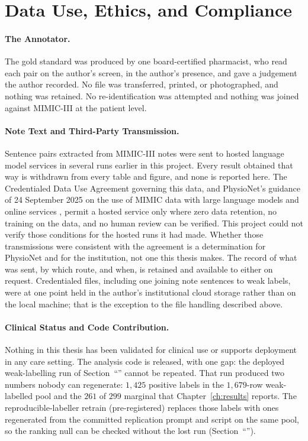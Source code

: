 \section{Data Use, Ethics, and Compliance}
\label{sec:m-ethics}

\paragraph{The Annotator.} The gold standard was produced by one board-certified pharmacist, who
read each pair on the author's screen, in the author's presence, and gave a judgement the author recorded. No file was transferred, printed, or photographed, and nothing was retained.
No re-identification was attempted and nothing was
joined against MIMIC-III at the patient level.

\paragraph{Note Text and Third-Party Transmission.} Sentence pairs extracted from MIMIC-III notes were sent to hosted language model services in several runs earlier in this project. Every result obtained that way is withdrawn from every table and figure, and none is reported here. The Credentialed Data Use Agreement governing this data, and PhysioNet's guidance of 24 September 2025 on the use of MIMIC data with large language models and online services \citep{physionet2025llm}, permit a hosted service only where zero data retention, no training on the data, and no human review can be verified. This project could not verify those conditions for the hosted runs it had made. Whether those transmissions were consistent with the agreement is a determination for PhysioNet and for the institution, not one this thesis makes. The record of what was sent, by which route, and when, is retained and available to either on request. Credentialed files, including one joining note sentences to weak labels, were at one point held in the author's institutional cloud storage rather than on the local machine; that is the exception to the file handling described above.

\paragraph{Clinical Status and Code Contribution.} Nothing in this thesis has been validated for
clinical use or supports deployment in any care setting. The analysis code is released, with one gap: the deployed weak-labelling run of Section~``'' cannot be repeated. That run produced two numbers nobody can regenerate: $1{,}425$ positive labels in the $1{,}679$-row weak-labelled pool
and the $261$ of $299$ marginal that Chapter~\ref{ch:results} reports. The
reproducible-labeller retrain (pre-registered) replaces those labels with ones
regenerated from the committed replication prompt and script on the same pool, so
the ranking null can be checked without the lost run
(Section~``'').
